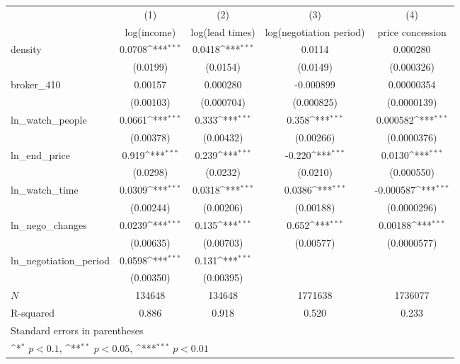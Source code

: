 {
\def\sym#1{\ifmmode^{#1}\else\(^{#1}\)\fi}
\begin{tabular}{l*{4}{c}}
\toprule
            &\multicolumn{1}{c}{(1)}&\multicolumn{1}{c}{(2)}&\multicolumn{1}{c}{(3)}&\multicolumn{1}{c}{(4)}\\
            &\multicolumn{1}{c}{log(income)}&\multicolumn{1}{c}{log(lead times)}&\multicolumn{1}{c}{log(negotiation period)}&\multicolumn{1}{c}{price concession}\\
\midrule
density     &      0.0708\sym{***}&      0.0418\sym{***}&      0.0114         &    0.000280         \\
            &    (0.0199)         &    (0.0154)         &    (0.0149)         &  (0.000326)         \\
\addlinespace
broker\_410  &     0.00157         &    0.000280         &   -0.000899         &  0.00000354         \\
            &   (0.00103)         &  (0.000704)         &  (0.000825)         & (0.0000139)         \\
\addlinespace
ln\_watch\_people&      0.0661\sym{***}&       0.333\sym{***}&       0.358\sym{***}&    0.000582\sym{***}\\
            &   (0.00378)         &   (0.00432)         &   (0.00266)         & (0.0000376)         \\
\addlinespace
ln\_end\_price&       0.919\sym{***}&       0.239\sym{***}&      -0.220\sym{***}&      0.0130\sym{***}\\
            &    (0.0298)         &    (0.0232)         &    (0.0210)         &  (0.000550)         \\
\addlinespace
ln\_watch\_time&      0.0309\sym{***}&      0.0318\sym{***}&      0.0386\sym{***}&   -0.000587\sym{***}\\
            &   (0.00244)         &   (0.00206)         &   (0.00188)         & (0.0000296)         \\
\addlinespace
ln\_nego\_changes&      0.0239\sym{***}&       0.135\sym{***}&       0.652\sym{***}&     0.00188\sym{***}\\
            &   (0.00635)         &   (0.00703)         &   (0.00577)         & (0.0000577)         \\
\addlinespace
ln\_negotiation\_period&      0.0598\sym{***}&       0.131\sym{***}&                     &                     \\
            &   (0.00350)         &   (0.00395)         &                     &                     \\
\midrule
\(N\)       &      134648         &      134648         &     1771638         &     1736077         \\
R-squared   &       0.886         &       0.918         &       0.520         &       0.233         \\
\bottomrule
\multicolumn{5}{l}{\footnotesize Standard errors in parentheses}\\
\multicolumn{5}{l}{\footnotesize \sym{*} \(p<0.1\), \sym{**} \(p<0.05\), \sym{***} \(p<0.01\)}\\
\end{tabular}
}
